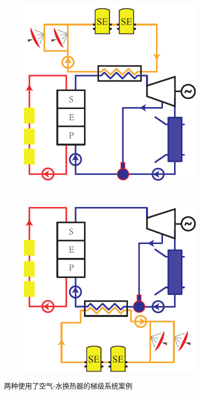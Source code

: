 \begin{figure}[htbp]
\centering
	\begin{subfigure}[b]{0.4\columnwidth}
	\includegraphics[width = \columnwidth]{fig/air-water1}
	\caption{}\label{fig:air-water_1}
	\end{subfigure}
	~
\begin{subfigure}[b]{0.4\columnwidth}
	\includegraphics[width = \columnwidth]{fig/air-water2}
	\caption{}
	\label{fig:air-water_2}
	\end{subfigure}
	\caption{两种使用了空气-水换热器的梯级系统案例}
	\label{fig:air-water}
\end{figure}

